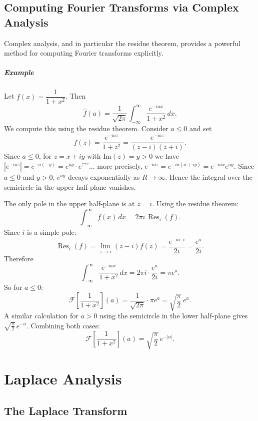 \section{Computing Fourier Transforms via Complex Analysis}

Complex analysis, and in particular the residue theorem, provides a powerful method for computing Fourier transforms explicitly.
\paragraph{Example}
\begin{example}
Let $f(x) = \dfrac{1}{1+x^2}$. Then
\[
\hat{f}(a) = \frac{1}{\sqrt{2\pi}}\int_{-\infty}^{\infty} \frac{e^{-iax}}{1+x^2}\, dx.
\]
We compute this using the residue theorem. Consider $a \leq 0$ and set
\[
f(z) = \frac{e^{-iaz}}{1+z^2} = \frac{e^{-iaz}}{(z-i)(z+i)}.
\]
Since $a \leq 0$, for $z = x + iy$ with $\mathrm{Im}(z) = y > 0$ we have $|e^{-iaz}| = e^{-a(-y)} = e^{ay} \cdot e^{???}$... more precisely, $e^{-iaz} = e^{-ia(x+iy)} = e^{-iax} e^{ay}$. Since $a \leq 0$ and $y > 0$, $e^{ay}$ decays exponentially as $R \to \infty$. Hence the integral over the semicircle in the upper half-plane vanishes.

The only pole in the upper half-plane is at $z = i$. Using the residue theorem:
\[
\int_{-\infty}^{\infty} f(x)\, dx = 2\pi i\,\operatorname{Res}_i(f).
\]
Since $i$ is a simple pole:
\[
\operatorname{Res}_i(f) = \lim_{z \to i}(z-i)f(z) = \frac{e^{-ia \cdot i}}{2i} = \frac{e^{a}}{2i}.
\]
Therefore
\[
\int_{-\infty}^{\infty} \frac{e^{-iax}}{1+x^2}\, dx = 2\pi i \cdot \frac{e^{a}}{2i} = \pi e^{a}.
\]
So for $a \leq 0$:
\[
\mathcal{F}\!\left[\frac{1}{1+x^2}\right](a) = \frac{1}{\sqrt{2\pi}} \cdot \pi e^{a} = \sqrt{\frac{\pi}{2}}\, e^{a}.
\]
A similar calculation for $a > 0$ using the semicircle in the lower half-plane gives $\sqrt{\tfrac{\pi}{2}}\,e^{-a}$. Combining both cases:
\[
\boxed{\mathcal{F}\!\left[\frac{1}{1+x^2}\right](a) = \sqrt{\frac{\pi}{2}}\, e^{-|a|}.}
\]
\end{example}

\chapter{Laplace Analysis}\label{chap:laplace_analysis}

\section{The Laplace Transform}

